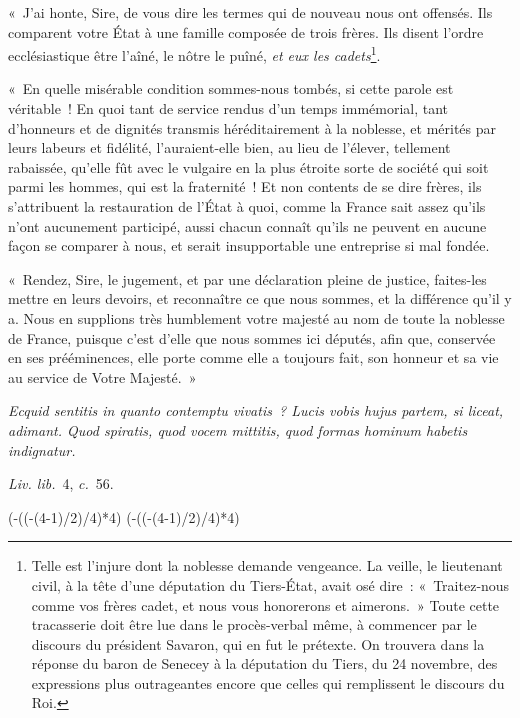 \documentclass[french,twoside]{book} %
\def\truncdiv#1#2{((#1-(#2-1)/2)/#2)}
\def\moduloop#1#2{(#1-\truncdiv{#1}{#2}*#2)}
\def\modulo#1#2{\number\numexpr\moduloop{#1}{#2}\relax}
\begin{document}
« J’ai honte, Sire, de vous dire les termes qui de nouveau nous ont offensés. Ils comparent votre État à une famille composée de trois frères. Ils disent l’ordre ecclésiastique être l’aîné, le nôtre le puîné, {\itshape et eux les cadets}\footnote{Telle est l’injure dont la noblesse demande vengeance. La veille, le lieutenant civil, à la tête d’une députation du Tiers-État, avait osé dire : « Traitez-nous comme vos frères cadet, et nous vous honorerons et aimerons. » Toute cette tracasserie doit être lue dans le procès-verbal même, à commencer par le discours du président Savaron, qui en fut le prétexte. On trouvera dans la réponse du baron de Senecey à la députation du Tiers, du 24 novembre, des expressions plus outrageantes encore que celles qui remplissent le discours du Roi.}.\par
« En quelle misérable condition sommes-nous tombés, si cette parole est véritable ! En quoi tant de service rendus d’un temps immémorial, tant d’honneurs et de dignités transmis héréditairement à la noblesse, et mérités par leurs labeurs et fidélité, l’auraient-elle bien, au lieu de l’élever, tellement rabaissée, qu’elle fût avec le vulgaire en la plus étroite sorte de société qui soit parmi les hommes, qui est la fraternité ! Et non contents de se dire frères, ils s’attribuent la restauration de l’État à quoi, comme la France sait assez qu’ils n’ont aucunement participé, aussi chacun connaît qu’ils ne peuvent en aucune façon se comparer à nous, et serait insupportable une entreprise si mal fondée.\par
« Rendez, Sire, le jugement, et par une déclaration pleine de justice, faites-les mettre en leurs devoirs, et reconnaître ce que nous sommes, et la différence qu’il y a. Nous en supplions très humblement votre majesté au nom de toute la noblesse de France, puisque c’est d’elle que nous sommes ici députés, afin que, conservée en ses prééminences, elle porte comme elle a toujours fait, son honneur et sa vie au service de Votre Majesté. »\par
\par
 {\itshape Ecquid sentitis in quanto contemptu vivatis ? Lucis vobis hujus partem, si liceat, adimant. Quod spiratis, quod vocem mittitis, quod formas hominum habetis indignatur.} \par
{\itshape Liv. lib.} 4, {\itshape c.} 56.
 


\ifbooklet
  \pagestyle{empty}
  \clearpage
  \ifnum\modulo{\value{page}}{4}=0 \hbox{}\newpage\hbox{}\newpage\fi
  \ifnum\modulo{\value{page}}{4}=1 \hbox{}\newpage\hbox{}\newpage\fi
\end{document}
